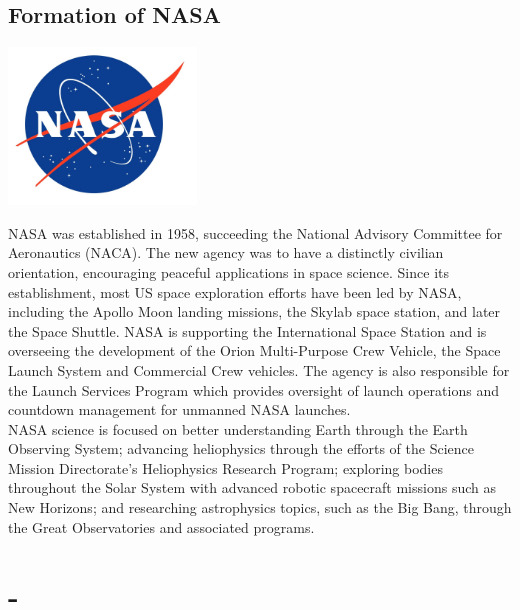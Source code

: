\documentclass[11pt]{report}
\begin{document}
\subsection{Formation of NASA}
\vspace{2mm}\begin{center}\includegraphics[width=5cm]{./img/nasaLogo.jpg}\end{center}
NASA was established in 1958, succeeding the National Advisory Committee for Aeronautics (NACA). The new agency was to have a distinctly civilian orientation, encouraging peaceful applications in space science. Since its establishment, most US space exploration efforts have been led by NASA, including the Apollo Moon landing missions, the Skylab space station, and later the Space Shuttle. NASA is supporting the International Space Station and is overseeing the development of the Orion Multi-Purpose Crew Vehicle, the Space Launch System and Commercial Crew vehicles. The agency is also responsible for the Launch Services Program which provides oversight of launch operations and countdown management for unmanned NASA launches.\\
\indent NASA science is focused on better understanding Earth through the Earth Observing System; advancing heliophysics through the efforts of the Science Mission Directorate's Heliophysics Research Program; exploring bodies throughout the Solar System with advanced robotic spacecraft missions such as New Horizons; and researching astrophysics topics, such as the Big Bang, through the Great Observatories and associated programs.
\section{-}
\end{document}
